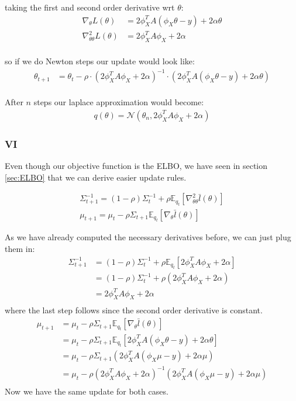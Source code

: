 \documentclass[a4paper]{scrartcl}
\begin{document}
    taking the first and second order derivative wrt $\theta$:
    \begin{align*}
      \nabla_\theta L(\theta) &= 2 \phi_X^T A (\phi_{X} \theta - y) + 2 \alpha \theta\\
      \nabla^2_{\theta\theta} L(\theta) &= 2 \phi_X^T A \phi_{X} + 2 \alpha\\
    \end{align*}

    so if we do Newton steps our update would look like:
    \begin{align*}
      \theta_{t+1} &= \theta_t - \rho \cdot (2 \phi_X^T A \phi_{X} + 2 \alpha)^{-1} \cdot (2 \phi_X^T A (\phi_{X} \theta - y) + 2 \alpha \theta)\\
    \end{align*}

    After $n$ steps our laplace approximation would become:
    \begin{align*}
      q(\theta) = \mathcal{N}(\theta_n, 2 \phi_X^T A \phi_{X} + 2 \alpha)
    \end{align*}

  \subsubsection{VI}
    Even though our objective function is the ELBO, we have seen in section
    \ref{sec:ELBO} that we can derive easier update rules.

    \begin{align*}
      \Sigma_{t+1}^{-1} = (1-\rho)\Sigma^{-1}_t + \rho \mathbb{E}_{q_t}[\nabla^2_{\theta\theta} \bar{l}(\theta)]\\
      \mu_{t+1} = \mu_t - \rho \Sigma_{t+1}\mathbb{E}_{q_t}[\nabla_{\theta} \bar{l}(\theta)]
    \end{align*}

    As we have already computed the necessary derivatives before, we can just plug them in:
    \begin{align*}
      \Sigma_{t+1}^{-1}
      &= (1-\rho)\Sigma^{-1}_t + \rho \mathbb{E}_{q_t}[2 \phi_X^T A \phi_{X} + 2 \alpha]\\
      &= (1-\rho)\Sigma^{-1}_t + \rho (2 \phi_X^T A \phi_{X} + 2 \alpha)\\
      &= 2 \phi_X^T A \phi_{X} + 2 \alpha\\
    \end{align*}
    where the last step follows since the second order derivative is constant.
    \begin{align*}
      \mu_{t+1} 
      &= \mu_t - \rho \Sigma_{t+1}\mathbb{E}_{q_t}[\nabla_{\theta} \bar{l}(\theta)]\\
      &= \mu_t - \rho \Sigma_{t+1}\mathbb{E}_{q_t}[2 \phi_X^T A (\phi_{X} \theta - y) + 2 \alpha \theta]\\
      &= \mu_t - \rho \Sigma_{t+1} (2 \phi_X^T A (\phi_{X} \mu - y) + 2 \alpha \mu)\\
      &= \mu_t - \rho (2 \phi_X^T A \phi_{X} + 2 \alpha)^{-1} (2 \phi_X^T A (\phi_{X} \mu - y) + 2 \alpha \mu)\\
    \end{align*}
    Now we have the same update for both cases.
\end{document}
